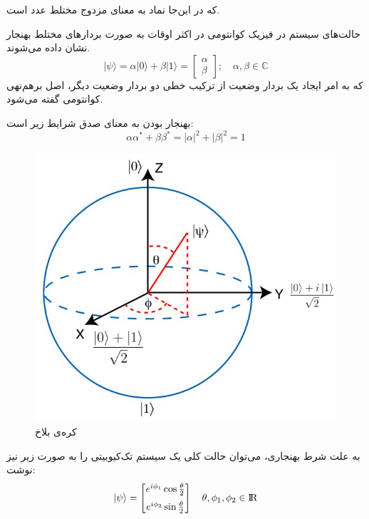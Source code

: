 که در این‌جا نماد \lr{$\alpha^*$}
به معنای مزدوج مختلط عدد \lr{$\alpha$}
است.
\newpage

حالت‌های سیستم در فیزیک کوانتومی در اکثر اوقات به صورت بردارهای مختلط بهنجار نشان داده می‌شوند.
\begin{equation}
    |\psi\rangle = \alpha |0\rangle + \beta |1\rangle = \begin{bmatrix} \alpha \\ \beta \end{bmatrix} 
    ; \mspace{18mu}
    \alpha, \beta \in \mathbb{C}
\end{equation}
{}
که به امر ایجاد یک بردار وضعیت از ترکیب خطی دو بردار وضعیت دیگر، اصل برهم‌نهی کوانتومی گفته می‌شود.

بهنجار بودن به معنای صدق شرایط زیر است:
\begin{equation}
    \alpha\alpha^* + \beta\beta^* = |\alpha|^2 + |\beta|^2 = 1
\end{equation}
\begin{figure}
	\centering
	\includegraphics[scale=0.4]{figures/bloch.jpg}
	\caption{کره‌ی بلاخ}
	\label{fig:bloch}
\end{figure}
به علت شرط بهنجاری، می‌توان حالت کلی یک سیستم تک‌کیوبیتی را به صورت زیر نیز نوشت:
\begin{equation}
|\psi\rangle = \begin{bmatrix} e^{i\phi_1}\cos{\tfrac{\theta}{2}} \\[6pt] e^{i\phi_2}\sin{\tfrac{\theta}{2}} \end{bmatrix} 
\mspace{18mu}
\theta, \phi_1, \phi_2 \in {\rm I\!R}
\end{equation}

